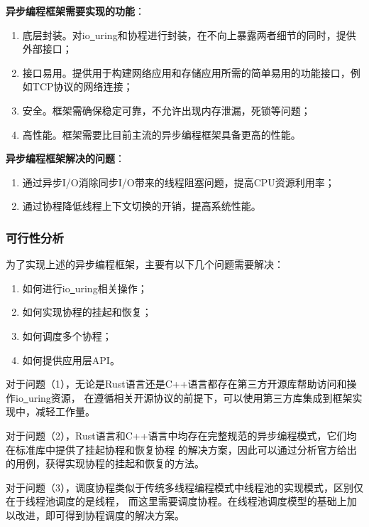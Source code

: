 \documentclass[supercite]{HustGraduPaper}
\theoremstyle{definition}
\begin{document}
\textbf{异步编程框架需要实现的功能}：
\begin{enumerate}[label={(\arabic*)}]
  \item 底层封装。对io\underline{~}uring和协程进行封装，在不向上暴露两者细节的同时，提供外部接口；
  \item 接口易用。提供用于构建网络应用和存储应用所需的简单易用的功能接口，例如TCP协议的网络连接；
  \item 安全。框架需确保稳定可靠，不允许出现内存泄漏，死锁等问题；
  \item 高性能。框架需要比目前主流的异步编程框架具备更高的性能。
\end{enumerate}

\textbf{异步编程框架解决的问题}：
\begin{enumerate}[label={(\arabic*)}]
  \item 通过异步I/O消除同步I/O带来的线程阻塞问题，提高CPU资源利用率；
  \item 通过协程降低线程上下文切换的开销，提高系统性能。
\end{enumerate}

\subsubsection{可行性分析}
为了实现上述的异步编程框架，主要有以下几个问题需要解决：
\begin{enumerate}[label={(\arabic*)}]
  \item 如何进行io\underline{~}uring相关操作；
  \item 如何实现协程的挂起和恢复；
  \item 如何调度多个协程；
  \item 如何提供应用层API。
\end{enumerate}

对于问题（1），无论是Rust语言还是C++语言都存在第三方开源库帮助访问和操作io\underline{~}uring资源，
在遵循相关开源协议的前提下，可以使用第三方库集成到框架实现中，减轻工作量。\par

对于问题（2），Rust语言和C++语言中均存在完整规范的异步编程模式，它们均在标准库中提供了挂起协程和恢复协程
的解决方案，因此可以通过分析官方给出的用例，获得实现协程的挂起和恢复的方法。\par

对于问题（3），调度协程类似于传统多线程编程模式中线程池的实现模式，区别仅在于线程池调度的是线程，
而这里需要调度协程。在线程池调度模型的基础上加以改进，即可得到协程调度的解决方案。\par
\end{document}

